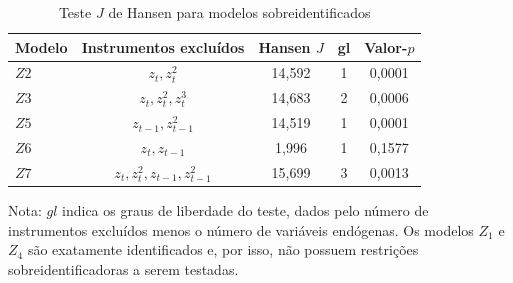\begin{table}[H]
    \centering
    \small
    \caption{Teste $J$ de Hansen para modelos sobreidentificados}
    \label{tab:hansen_sobreidentificados}
    \setlength{\tabcolsep}{5pt}
    \begin{tabular}{lcccc}
        \hline
        Modelo & Instrumentos excluídos & Hansen $J$ & gl & Valor-$p$ \\
        \hline
        $Z2$ & ${z_t, z_t^2}$ & 14,592 & 1 & 0,0001 \\
        $Z3$ & ${z_t, z_t^2, z_t^3}$ & 14,683 & 2 & 0,0006 \\
        $Z5$ & ${z_{t-1}, z_{t-1}^2}$ & 14,519 & 1 & 0,0001 \\
        $Z6$ & ${z_t, z_{t-1}}$ & 1,996 & 1 & 0,1577 \\
        $Z7$ & ${z_t, z_t^2, z_{t-1}, z_{t-1}^2}$ & 15,699 & 3 & 0,0013 \\
        \hline
    \end{tabular}

    \vspace{0.3em}
    \begin{minipage}{0.92\textwidth}
    \footnotesize
    Nota: $gl$ indica os graus de liberdade do teste, dados pelo número de instrumentos excluídos menos o número de variáveis endógenas. Os modelos $Z_1$ e $Z_4$ são exatamente identificados e, por isso, não possuem restrições sobreidentificadoras a serem testadas.
    \end{minipage}
\end{table}
